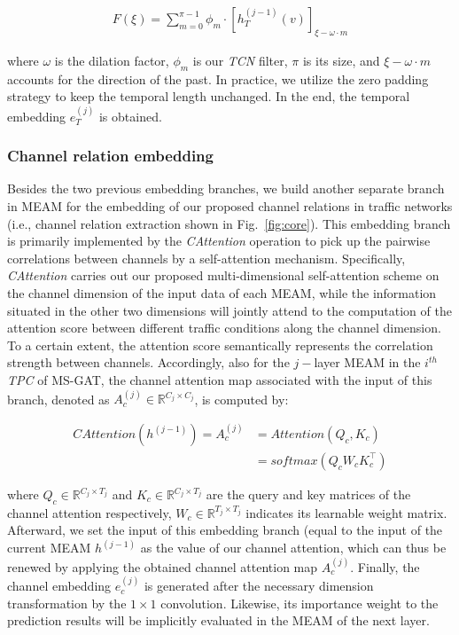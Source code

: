 \begin{equation}
    \label{eqn:dilated_causal_convolution}
    \begin{aligned}
        F(\xi) = \sum_{m=0}^{\pi-1} \phi_m \cdot [h_T^{(j-1)}(v)]_{\xi-\omega \cdot m}
    \end{aligned}
\end{equation}

where $\omega$ is the dilation factor, $\phi_m$ is our \textit{TCN} filter, $\pi$ is its size, and $\xi-\omega \cdot m$ accounts for the direction of the past. In practice, we utilize the zero padding strategy to keep the temporal length unchanged. In the end, the temporal embedding $e_T^{(j)}$ is obtained.

\subsubsection{Channel relation embedding}
Besides the two previous embedding branches, we build another separate branch in MEAM for the embedding of our proposed channel relations in traffic networks (i.e., channel relation extraction shown in Fig.~\ref{fig:core}). This embedding branch is primarily implemented by the \textit{CAttention} operation to pick up the pairwise correlations between channels by a self-attention mechanism. Specifically, \textit{CAttention}  carries out our proposed multi-dimensional self-attention scheme on the channel dimension of the input data of each MEAM, while the information situated in the other two dimensions will jointly attend to the computation of the attention score between different traffic conditions along the channel dimension. To a certain extent, the attention score semantically represents the correlation strength between channels. Accordingly, also for the $j-$layer MEAM in the $i^{th}$ \textit{TPC} of MS-GAT, the channel attention map associated with the input of this branch, denoted as $A_c^{(j)} \in \mathbb{R}^{C_j \times C_j}$, is computed by:

\begin{equation}
    \label{eqn:channel_attention}
    \begin{aligned}
        CAttention(h^{(j-1)})  = A_c^{(j)} & = Attention(Q_c, K_c)      \\
                                           & = softmax(Q_c W_c K_c^\top)
    \end{aligned}
\end{equation}

where $Q_c \in \mathbb{R}^{C_j \times T_j}$ and $K_c \in \mathbb{R}^{C_j \times T_j}$ are the query and key matrices of the channel attention respectively, $W_c \in \mathbb{R}^{T_j \times T_j}$ indicates its learnable weight matrix. Afterward, we set the input of this embedding branch (equal to the input of the current MEAM $h^{(j-1)}$ as the value of our channel attention, which can thus be renewed by applying the obtained channel attention map $A_c^{(j)}$. Finally, the channel embedding $e_c^{(j)}$ is generated after the necessary dimension transformation by the $1 \times 1$ convolution. Likewise, its importance weight to the prediction results will be implicitly evaluated in the MEAM of the next layer.